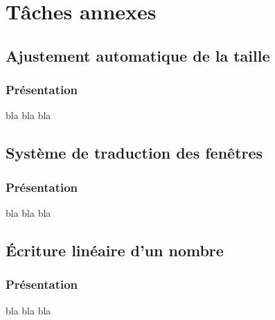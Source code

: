 \chapter{Tâches annexes}
\section{Ajustement automatique de la taille}
\subsection{Présentation}
bla bla bla

\section{Système de traduction des fenêtres}
\subsection{Présentation}
bla bla bla

\section{Écriture linéaire d'un nombre}
\subsection{Présentation}
bla bla bla
